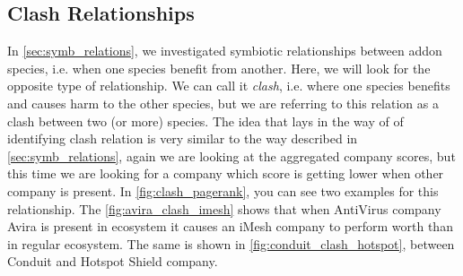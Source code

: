 \documentclass[11pt,oneside]{book}
\let\Oldsubsection\subsection
\renewcommand{\subsection}{\FloatBarrier\Oldsubsection}
\begin{document}
\subsection{Clash Relationships}
\label{sec:clash_relations}

In \autoref{sec:symb_relations}, we investigated symbiotic relationships between addon species, i.e. when one species benefit from another. Here, we will look for the opposite type of relationship. We can call it \emph{clash}, i.e. where one species benefits and causes harm to the other species, but we are referring to this relation as a clash between two (or more) species. The idea that lays in the way of of identifying clash relation is very similar to the way described in \autoref{sec:symb_relations}, again we are looking at the aggregated company scores, but this time we are looking for a company which score is getting lower when other company is present. In \autoref{fig:clash_pagerank}, you can see two examples for this relationship. The \autoref{fig:avira_clash_imesh} shows that when AntiVirus company Avira is present in ecosystem it causes an iMesh company to perform worth than in regular ecosystem. The same is shown in \autoref{fig:conduit_clash_hotspot}, between Conduit and Hotspot Shield company.
\end{document}
